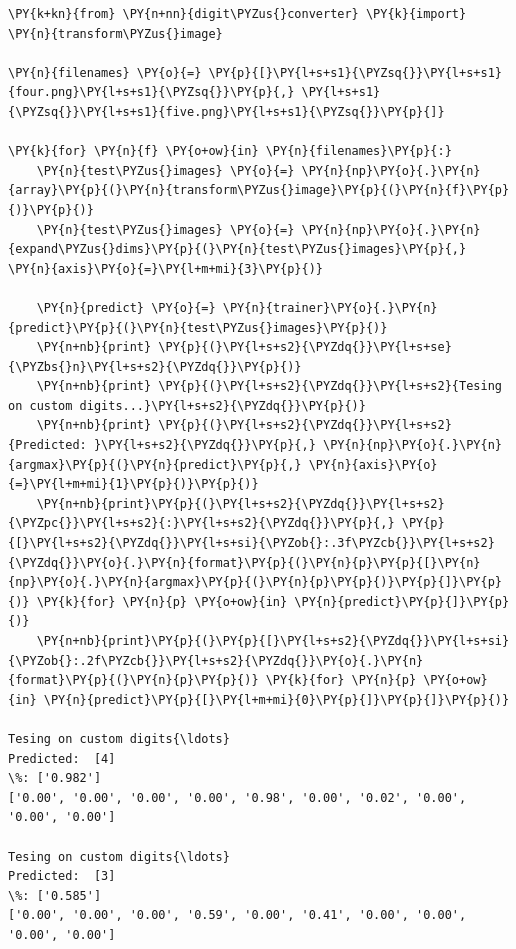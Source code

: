 \begin{tcolorbox}[breakable, size=fbox, boxrule=1pt, pad at break*=1mm,colback=cellbackground, colframe=cellborder]
\begin{Verbatim}[commandchars=\\\{\}]
\PY{k+kn}{from} \PY{n+nn}{digit\PYZus{}converter} \PY{k}{import} \PY{n}{transform\PYZus{}image}
	
\PY{n}{filenames} \PY{o}{=} \PY{p}{[}\PY{l+s+s1}{\PYZsq{}}\PY{l+s+s1}{four.png}\PY{l+s+s1}{\PYZsq{}}\PY{p}{,} \PY{l+s+s1}{\PYZsq{}}\PY{l+s+s1}{five.png}\PY{l+s+s1}{\PYZsq{}}\PY{p}{]}
	
\PY{k}{for} \PY{n}{f} \PY{o+ow}{in} \PY{n}{filenames}\PY{p}{:}
    \PY{n}{test\PYZus{}images} \PY{o}{=} \PY{n}{np}\PY{o}{.}\PY{n}{array}\PY{p}{(}\PY{n}{transform\PYZus{}image}\PY{p}{(}\PY{n}{f}\PY{p}{)}\PY{p}{)}
    \PY{n}{test\PYZus{}images} \PY{o}{=} \PY{n}{np}\PY{o}{.}\PY{n}{expand\PYZus{}dims}\PY{p}{(}\PY{n}{test\PYZus{}images}\PY{p}{,} \PY{n}{axis}\PY{o}{=}\PY{l+m+mi}{3}\PY{p}{)}
	
    \PY{n}{predict} \PY{o}{=} \PY{n}{trainer}\PY{o}{.}\PY{n}{predict}\PY{p}{(}\PY{n}{test\PYZus{}images}\PY{p}{)}
    \PY{n+nb}{print} \PY{p}{(}\PY{l+s+s2}{\PYZdq{}}\PY{l+s+se}{\PYZbs{}n}\PY{l+s+s2}{\PYZdq{}}\PY{p}{)}
    \PY{n+nb}{print} \PY{p}{(}\PY{l+s+s2}{\PYZdq{}}\PY{l+s+s2}{Tesing on custom digits...}\PY{l+s+s2}{\PYZdq{}}\PY{p}{)}
    \PY{n+nb}{print} \PY{p}{(}\PY{l+s+s2}{\PYZdq{}}\PY{l+s+s2}{Predicted: }\PY{l+s+s2}{\PYZdq{}}\PY{p}{,} \PY{n}{np}\PY{o}{.}\PY{n}{argmax}\PY{p}{(}\PY{n}{predict}\PY{p}{,} \PY{n}{axis}\PY{o}{=}\PY{l+m+mi}{1}\PY{p}{)}\PY{p}{)}
    \PY{n+nb}{print}\PY{p}{(}\PY{l+s+s2}{\PYZdq{}}\PY{l+s+s2}{\PYZpc{}}\PY{l+s+s2}{:}\PY{l+s+s2}{\PYZdq{}}\PY{p}{,} \PY{p}{[}\PY{l+s+s2}{\PYZdq{}}\PY{l+s+si}{\PYZob{}:.3f\PYZcb{}}\PY{l+s+s2}{\PYZdq{}}\PY{o}{.}\PY{n}{format}\PY{p}{(}\PY{n}{p}\PY{p}{[}\PY{n}{np}\PY{o}{.}\PY{n}{argmax}\PY{p}{(}\PY{n}{p}\PY{p}{)}\PY{p}{]}\PY{p}{)} \PY{k}{for} \PY{n}{p} \PY{o+ow}{in} \PY{n}{predict}\PY{p}{]}\PY{p}{)}
    \PY{n+nb}{print}\PY{p}{(}\PY{p}{[}\PY{l+s+s2}{\PYZdq{}}\PY{l+s+si}{\PYZob{}:.2f\PYZcb{}}\PY{l+s+s2}{\PYZdq{}}\PY{o}{.}\PY{n}{format}\PY{p}{(}\PY{n}{p}\PY{p}{)} \PY{k}{for} \PY{n}{p} \PY{o+ow}{in} \PY{n}{predict}\PY{p}{[}\PY{l+m+mi}{0}\PY{p}{]}\PY{p}{]}\PY{p}{)}

Tesing on custom digits{\ldots}
Predicted:  [4]
\%: ['0.982']
['0.00', '0.00', '0.00', '0.00', '0.98', '0.00', '0.02', '0.00', '0.00', '0.00']

Tesing on custom digits{\ldots}
Predicted:  [3]
\%: ['0.585']
['0.00', '0.00', '0.00', '0.59', '0.00', '0.41', '0.00', '0.00', '0.00', '0.00']
\end{Verbatim}
\end{tcolorbox}

